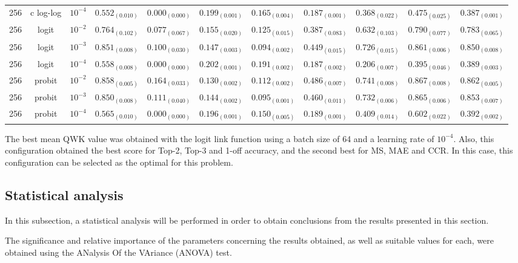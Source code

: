 \documentclass[journal]{IEEEtran}
\begin{document}
\begin{table*}[!t]
\begin{tabular}{c@{\hskip 0.15cm}c@{\hskip 0.15cm}c|c@{\hskip 0.30cm}c@{\hskip 0.20cm}c@{\hskip 0.20cm}c@{\hskip 0.20cm}c@{\hskip 0.20cm}c@{\hskip 0.20cm}c@{\hskip 0.20cm}c}
			256 & c log-log & $10^{-4}$ & $0.552_{(0.010)}$ & $0.000_{(0.000)}$ & $0.199_{(0.001)}$ & $0.165_{(0.004)}$ & $0.187_{(0.001)}$ & $0.368_{(0.022)}$ & $0.475_{(0.025)}$ & $0.387_{(0.001)}$\\
			256 & logit & $10^{-2}$ & $0.764_{(0.102)}$ & $0.077_{(0.067)}$ & $0.155_{(0.020)}$ & $0.125_{(0.015)}$ & $0.387_{(0.083)}$ & $0.632_{(0.103)}$ & $0.790_{(0.077)}$ & $0.783_{(0.065)}$\\
			256 & logit & $10^{-3}$ & $0.851_{(0.008)}$ & $0.100_{(0.030)}$ & $0.147_{(0.003)}$ & $\mathbf{0.094_{(0.002)}}$ & $0.449_{(0.015)}$ & $0.726_{(0.015)}$ & $0.861_{(0.006)}$ & $0.850_{(0.008)}$\\
			256 & logit & $10^{-4}$ & $0.558_{(0.008)}$ & $0.000_{(0.000)}$ & $0.202_{(0.001)}$ & $0.191_{(0.002)}$ & $0.187_{(0.002)}$ & $0.206_{(0.007)}$ & $0.395_{(0.046)}$ & $0.389_{(0.003)}$\\
			256 & probit & $10^{-2}$ & $0.858_{(0.005)}$ & $0.164_{(0.033)}$ & $0.130_{(0.002)}$ & $0.112_{(0.002)}$ & $0.486_{(0.007)}$ & $0.741_{(0.008)}$ & $0.867_{(0.008)}$ & $0.862_{(0.005)}$\\
			256 & probit & $10^{-3}$ & $0.850_{(0.008)}$ & $0.111_{(0.040)}$ & $0.144_{(0.002)}$ & $\mathit{0.095_{(0.001)}}$ & $0.460_{(0.011)}$ & $0.732_{(0.006)}$ & $0.865_{(0.006)}$ & $0.853_{(0.007)}$\\
			256 & probit & $10^{-4}$ & $0.565_{(0.010)}$ & $0.000_{(0.000)}$ & $0.196_{(0.001)}$ & $0.150_{(0.005)}$ & $0.189_{(0.001)}$ & $0.409_{(0.014)}$ & $0.602_{(0.022)}$ & $0.392_{(0.002)}$
		\end{tabular}
	\end{table*}
	
	The best mean QWK value was obtained with the logit link function using a batch size of 64 and a learning rate of $10^{-4}$. Also, this configuration obtained the best score for Top-2, Top-3 and 1-off accuracy, and the second best for MS, MAE and CCR. In this case, this configuration can be selected as the optimal for this problem.
	
	\subsection{Statistical analysis}
	\label{sect:statisticalanalysis}
	In this subsection, a statistical analysis will be performed in order to obtain conclusions from the results presented in this section.
	
	The significance and relative importance of the parameters concerning the results obtained, as well as suitable values for each, were obtained using the ANalysis Of the VAriance (ANOVA) test.
	
\end{document}
